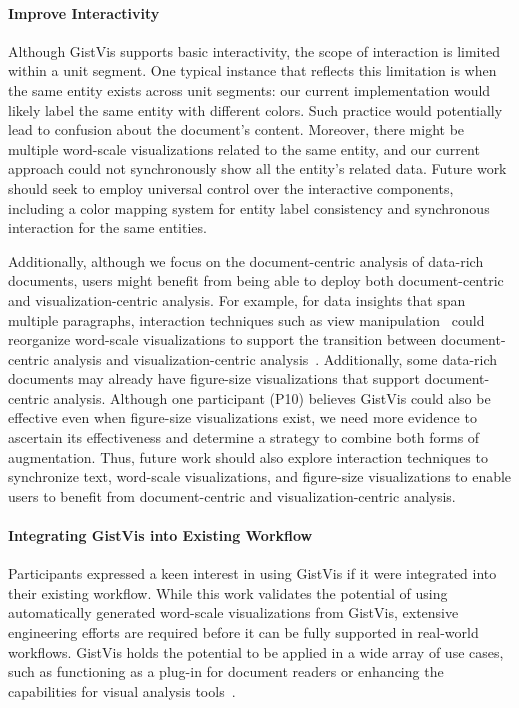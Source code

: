 \paragraph{Improve Interactivity}
Although GistVis supports basic interactivity, the scope of interaction is limited within a unit segment. One typical instance that reflects this limitation is when the same entity exists across unit segments: our current implementation would likely label the same entity with different colors. Such practice would potentially lead to confusion about the document's content. Moreover, there might be multiple word-scale visualizations related to the same entity, and our current approach could not synchronously show all the entity's related data. Future work should seek to employ universal control over the interactive components, including a color mapping system for entity label consistency and synchronous interaction for the same entities. 

Additionally, although we focus on the document-centric analysis of data-rich documents, users might benefit from being able to deploy both document-centric and visualization-centric analysis. For example, for data insights that span multiple paragraphs, interaction techniques such as view manipulation~\cite{heer2012interactive} could reorganize word-scale visualizations to support the transition between document-centric analysis and visualization-centric analysis~\cite{goffin2020Interaction}. Additionally, some data-rich documents may already have figure-size visualizations that support document-centric analysis. Although one participant (P10) believes GistVis could also be effective even when figure-size visualizations exist, we need more evidence to ascertain its effectiveness and determine a strategy to combine both forms of augmentation. Thus, future work should also explore interaction techniques to synchronize text, word-scale visualizations, and figure-size visualizations to enable users to benefit from document-centric and visualization-centric analysis.


\paragraph{Integrating GistVis into Existing Workflow}
Participants expressed a keen interest in using GistVis if it were integrated into their existing workflow. While this work validates the potential of using automatically generated word-scale visualizations from GistVis, extensive engineering efforts are required before it can be fully supported in real-world workflows. GistVis holds the potential to be applied in a wide array of use cases, such as functioning as a plug-in for document readers or enhancing the capabilities for visual analysis tools~\cite{ava-ntv-2024}.





